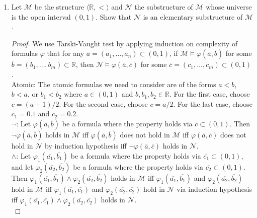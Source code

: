 \documentclass{article}
\begin{document}
\begin{enumerate}
\begin{enumerate}
\begin{proof}
          For each $n\in\mathbb{N}\setminus\{0,1\}$, $S_n$ is unique,
          hence we have infinitely many minimal definable and infinite
          subsets $S_n$.
        \end{proof}
    \end{enumerate}

  \item Let $\mathcal{M}$ be the structure
    $\langle\mathbb{R},<\rangle$ and $\mathcal{N}$ the substructure of
    $\mathcal{M}$ whose universe is the open interval $(0,1)$. Show
    that $\mathcal{N}$ is an elementary substructure of $\mathcal{M}$.

    \begin{proof}
      We use Tarski-Vaught test by applying induction on complexity of
      formulas $\varphi$ that for any
      $\overline{a}=(a_1,\ldots,a_n)\subset(0,1)$, if
      $\mathcal{M}\models\varphi(\overline{a},\overline{b})$ for some
      $\overline{b}=(b_1,\ldots,b_m)\subset\mathbb{R}$, then
      $\mathcal{N}\models\varphi(\overline{a},\overline{c})$ for some
      $\overline{c}=(c_1,\ldots,c_m)\subset(0,1)$. \\

      Atomic: The atomic formulas we need to consider are of the forms
      $a<b$, $b<a$, or $b_1<b_2$ where $a\in(0,1)$ and
      $b,b_1,b_2\in\mathbb{R}$. For the first case, choose $c=(a+1)/2$. For
      the second case, choose $c=a/2$. For the last case, choose $c_1=0.1$
      and $c_2=0.2$. \\

      $\neg$: Let $\varphi(\overline{a},\overline{b})$ be a formula where
      the property holds via $\overline{c}\subset(0,1)$. Then
      $\neg\varphi(\overline{a},\overline{b})$ holds in $\mathcal{M}$ iff
      $\varphi(\overline{a},\overline{b})$ does not hold in $\mathcal{M}$
      iff $\varphi(\overline{a},\overline{c})$ does not hold in
      $\mathcal{N}$ by induction hypothesis iff
      $\neg\varphi(\overline{a},\overline{c})$ holds in $\mathcal{N}$. \\

      $\wedge$: Let $\varphi_1(\overline{a_1},\overline{b_1})$ be a formula
      where the property holds via $\overline{c_1}\subset(0,1)$, and let
      $\varphi_2(\overline{a_2},\overline{b_2})$ be a formula where the
      property holds via $\overline{c_2}\subset(0,1)$. Then
      $\varphi_1(\overline{a_1},\overline{b_1})\wedge\varphi_2(\overline{a_2},\overline{b_2})$
      holds in $\mathcal{M}$ iff $\varphi_1(\overline{a_1},\overline{b_1})$
      and $\varphi_2(\overline{a_2},\overline{b_2})$ hold in $\mathcal{M}$
      iff $\varphi_1(\overline{a_1},\overline{c_1})$ and
      $\varphi_2(\overline{a_2},\overline{c_2})$ hold in $\mathcal{N}$ via
      induction hypothesis iff
      $\varphi_1(\overline{a_1},\overline{c_1})\wedge\varphi_2(\overline{a_2},\overline{c_2})$
      holds in $\mathcal{N}$. \\


\end{proof}
\end{enumerate}
\end{document}
